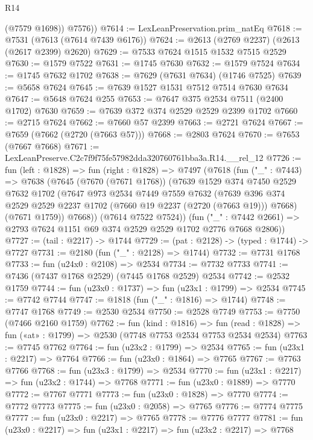\begin{lexlean}{R14}
\begin{coremodule}
          (@7579 @1698))
        @7576))
@7614 := LexLeanPreservation.prim_natEq
@7618 := @7531 (@7613 (@7614 @7439 @6176))
@7624 := @2613 (@2769 @2237) (@2613 (@2617 @2399) @2620)
@7629 := @7533 @7624 @1515 @1532 @7515 @2529
@7630 := @1579 @7522
@7631 := @1745 @7630
@7632 := @1579 @7524
@7634 := @1745 @7632 @1702
@7638 := @7629 (@7631 @7634) (@1746 @7525)
@7639 := @5658 @7624
@7645 := @7639 @1527 @1531 @7512 @7514 @7630 @7634
@7647 := @5648 @7624 @255
@7653 := @7647 @375 @2534 @7511 (@2400 @1702) @7630
@7659 := @7639 @372 @374 @2529 @2529 @2399 @1702
@7660 := @2715 @7624
@7662 := @7660 @57 @2399
@7663 := @2721 @7624
@7667 := @7659 (@7662 (@2720 (@7663 @57)))
@7668 := @2803 @7624
@7670 := @7653 (@7667 @7668)
@7671 := LexLeanPreserve.C2c7f9f75fe57982dda320760761bba3a.R14.__rel_12
@7726 := fun (left : @1828) =>
  fun (right : @1828) =>
  @7497
    (@7618
      (fun ("_" : @7443) =>
      @7638
        (@7645
          (@7670 (@7671 @1768))
          (@7639
            @1529
            @374
            @7450
            @2529
            @7632
            @1702
            (@7647
              @973
              @2534
              @7449
              @7559
              @7632
              (@7639 @396 @374 @2529 @2529 @2237 @1702 (@7660 @19 @2237 (@2720 (@7663 @19))) @7668)
              (@7671 @1759))
            @7668))
        (@7614 @7522 @7524))
      (fun ("_" : @7442 @2661) => @2793 @7624 @1151 @69 @374 @2529 @2529 @1702 @2776 @7668 @2806))
@7727 := (tail : @2217) -> @1744
@7729 := (pat : @2128) -> (typed : @1744) -> @7727
@7731 := @2180 (fun ("_" : @2128) => @1744)
@7732 := @7731 @1768
@7733 := fun (u24x0 : @2108) => @2534
@7734 := @7732 @7733
@7741 := @7436 (@7437 @1768 @2529) (@7445 @1768 @2529) @2534
@7742 := @2532 @1759
@7744 := fun (u23x0 : @1737) => fun (u23x1 : @1799) => @2534
@7745 := @7742 @7744
@7747 := @1818 (fun ("_" : @1816) => @1744)
@7748 := @7747 @1768
@7749 := @2530 @2534
@7750 := @2528 @7749
@7753 := @7750 (@7466 @2160 @1759)
@7762 := fun (kind : @1816) =>
  fun (read : @1828) => fun («at» : @1799) => @2530 (@7748 @7753 @2534 @7753 @2534 @2534)
@7763 := @7745 @7762
@7764 := fun (u23x2 : @1799) => @2534
@7765 := fun (u23x1 : @2217) => @7764
@7766 := fun (u23x0 : @1864) => @7765
@7767 := @7763 @7766
@7768 := fun (u23x3 : @1799) => @2534
@7770 := fun (u23x1 : @2217) => fun (u23x2 : @1744) => @7768
@7771 := fun (u23x0 : @1889) => @7770
@7772 := @7767 @7771
@7773 := fun (u23x0 : @1828) => @7770
@7774 := @7772 @7773
@7775 := fun (u23x0 : @2058) => @7765
@7776 := @7774 @7775
@7777 := fun (u23x0 : @2217) => @7765
@7778 := @7776 @7777
@7781 := fun (u23x0 : @2217) => fun (u23x1 : @2217) => fun (u23x2 : @2217) => @7768

\end{coremodule}
\end{lexlean}
